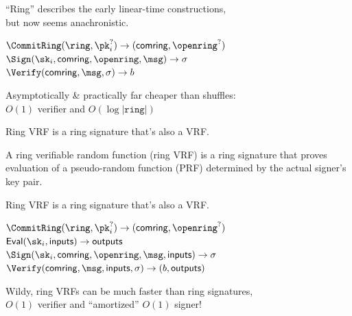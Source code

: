 \documentclass{beamer}
\def\comring{\ensuremath{\mathsf{comring}}\xspace}
\begin{document}
\begin{frame}%

``Ring'' describes the early linear-time constructions, \\
\hspace{10pt} but now seems anachronistic.

\bigskip\bigskip

$\CommitRing(\ring, \pk_i^?)  \rightarrow (\comring, \openring^?)$ \\
$\Sign(\sk_i, \comring,\openring, \msg)\rightarrow \sigma$ \\
$\Verify(\comring,\msg,\sigma) \rightarrow  b$

\bigskip\bigskip

Asymptotically \& practically far cheaper than shuffles: \\ \smallskip
\hspace{10pt} $O(1)$ verifier and $O(\log |\mathtt{ring}|)$

\end{frame}



\begin{frame}

Ring VRF is a ring signature that's also a VRF.

\bigskip\bigskip 

A ring verifiable random function (ring VRF) is a ring signature that
 proves evaluation of a pseudo-random function (PRF) determined by
 the actual signer's key pair.

\end{frame}



\begin{frame}

Ring VRF is a ring signature that's also a VRF.

\bigskip\bigskip 

$\CommitRing(\ring, \pk_i^?)  \rightarrow (\comring, \openring^?)$ \\
$\mathsf{Eval}(\sk_i, \mathsf{inputs} )\rightarrow \mathsf{outputs}$ \\
$\Sign(\sk_i, \comring,\openring, \msg, \mathsf{inputs} )\rightarrow \sigma$ \\
$\Verify(\comring,\msg, \mathsf{inputs}, \sigma) \rightarrow  (b,\mathsf{outputs})$

\bigskip\bigskip 

Wildy, ring VRFs can be much faster than ring signatures, \\ \smallskip
\hspace{10pt} $O(1)$ verifier and  ``amortized'' $O(1)$ signer!

\end{frame}
\end{document}
